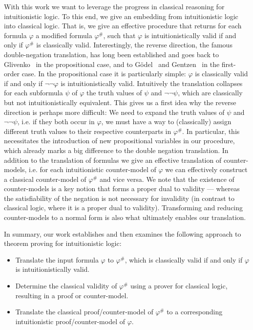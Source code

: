 \documentclass[runningheads]{llncs}
\begin{document}
With this work we want to leverage the progress in classical reasoning for intuitionistic logic.
To this end, we give an embedding from intuitionistic logic into classical logic. 
That is, we give an effective procedure that returns for each formula $\varphi$ a modified formula $\varphi^\#$, such that $\varphi$ is intuitionistically valid if and only if $\varphi^\#$ is classically valid.
Interestingly, the reverse direction, the famous double-negation translation, has long been established and goes back to Glivenko~\cite{glivenko1929quelques} in the propositional case, and to G\"odel~\cite{godel1933intuitionistischen} and Gentzen~\cite{gentzen1936widerspruchsfreiheit} in the first-order case. In the propositional case it is particularly simple: $\varphi$ is classically valid if and only if $\neg\neg\varphi$ is intuitionistically valid. Intuitively the translation collapses for each subformula $\psi$ of $\varphi$ the truth values of $\psi$ and $\neg\neg\psi$, which are classically but not intuitionistically equivalent. This gives us a first idea why the reverse direction is perhaps more difficult: We need to expand the truth values of $\psi$ and $\neg\neg\psi$, i.e. if they both occur in $\varphi$, we must have a way to (classically) assign different truth values to their respective counterparts in $\varphi^\#$. In particular, this necessitates the introduction of new propositional variables in our procedure, which already marks a big difference to the double negation translation.
%
In addition to the translation of formulas we give an effective translation of counter-models, i.e. for each intuitionistic counter-model of $\varphi$ we can effectively construct a classical counter-model of $\varphi^\#$ and vice versa.
We note that the existence of counter-models is a key notion that forms a proper dual to validity --- whereas the satisfiability of the negation is not necessary for invalidity (in contrast to classical logic, where it is a proper dual to validity).
Transforming and reducing counter-models to a normal form is also what ultimately enables our translation.

In summary, our work establishes and then examines the following approach to theorem proving for intuitionistic logic:
\begin{itemize}
	\item Translate the input formula $\varphi$ to $\varphi^\#$, which is classically valid if and only if $\varphi$ is intuitionistically valid.
	\item Determine the classical validity of $\varphi^\#$ using a prover for classical logic, resulting in a proof or counter-model.
	\item Translate the classical proof/counter-model of $\varphi^\#$ to a corresponding intuitionistic proof/counter-model of $\varphi$.
\end{itemize}
\end{document}
